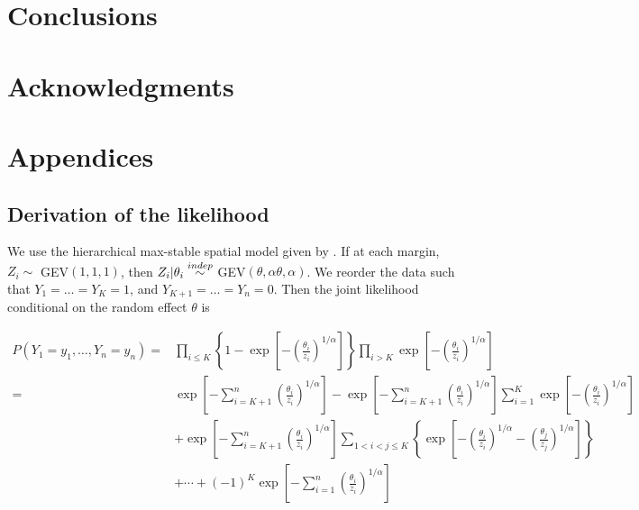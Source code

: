 \documentclass[11pt]{article}
\begin{document}
\begin{}

\section{Conclusions}\label{s:con}

\section*{Acknowledgments}

\appendix
\section{Appendices}

\subsection{Derivation of the likelihood} \label{a:likelihoodderivation}
We use the hierarchical max-stable spatial model given by \citet{Reich2012}. If at each margin, $Z_i \sim $ GEV$(1,1,1)$, then $Z_i | \theta_i \stackrel{indep}{\sim} $ GEV$(\theta, \alpha \theta, \alpha)$. We reorder the data such that $Y_1=\ldots=Y_K=1$, and $Y_{K+1} = \ldots = Y_n = 0$. Then the joint likelihood conditional on the random effect $\theta$ is

\begin{align} \label{joint_cond}
	P(Y_1=y_1,\ldots,Y_n=y_n) =& \prod_{ i \le K } \left\{ 1 - \exp \left[ - \left( \frac{ \theta_i }{ z_i } \right)^{ 1/\alpha} \right] \right \} \prod_{ i > K } \exp \left[ -\left( \frac{ \theta_i }{ z_i } \right)^{1/\alpha} \right] \nonumber \\[0.5em]
		=& \exp \left[ -\sum_{ i = K+1}^{ n }\left( \frac{ \theta_i }{ z_i } \right)^{1/\alpha} \right] - \exp \left[ -\sum_{ i = K+1}^{ n }\left( \frac{ \theta_i }{ z_i } \right)^{1/\alpha} \right] \sum_{ i = 1}^{K} \exp\left[ -\left( \frac{ \theta_i }{ z_i } \right)^{ 1/\alpha} \right] \nonumber\\
		&  + \exp \left[ -\sum_{ i = K+1}^{ n }\left( \frac{ \theta_i }{ z_i } \right)^{1/\alpha} \right] \sum_{ 1 < i < j \le K } \left\{ \exp \left[ - \left( \frac{ \theta_i }{ z_i } \right)^{ 1/\alpha} - \left( \frac{ \theta_j }{ z_j } \right)^{ 1/\alpha } \right] \right \} \nonumber \\[0.5em]
		& + \cdots + (-1)^K \exp\left[ - \sum_{ i = 1 }^{ n }\left( \frac{ \theta_i }{ z_i } \right)^{ 1/\alpha} \right]
\end{align}


\end{}
\end{document}

